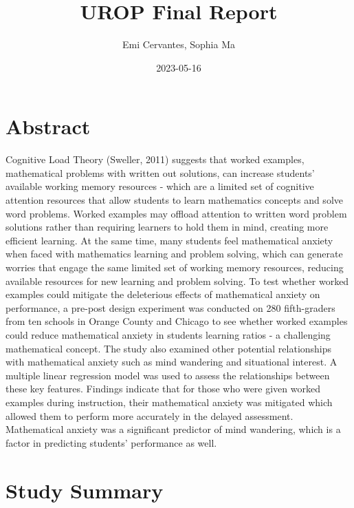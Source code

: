 \documentclass[
]{article}
\title{UROP Final Report}
\author{Emi Cervantes, Sophia Ma}
\date{2023-05-16}
\begin{document}
\maketitle

\hypertarget{abstract}{%
\section{Abstract}\label{abstract}}

Cognitive Load Theory (Sweller, 2011) suggests that worked examples,
mathematical problems with written out solutions, can increase students'
available working memory resources - which are a limited set of
cognitive attention resources that allow students to learn mathematics
concepts and solve word problems. Worked examples may offload attention
to written word problem solutions rather than requiring learners to hold
them in mind, creating more efficient learning. At the same time, many
students feel mathematical anxiety when faced with mathematics learning
and problem solving, which can generate worries that engage the same
limited set of working memory resources, reducing available resources
for new learning and problem solving. To test whether worked examples
could mitigate the deleterious effects of mathematical anxiety on
performance, a pre-post design experiment was conducted on 280
fifth-graders from ten schools in Orange County and Chicago to see
whether worked examples could reduce mathematical anxiety in students
learning ratios - a challenging mathematical concept. The study also
examined other potential relationships with mathematical anxiety such as
mind wandering and situational interest. A multiple linear regression
model was used to assess the relationships between these key features.
Findings indicate that for those who were given worked examples during
instruction, their mathematical anxiety was mitigated which allowed them
to perform more accurately in the delayed assessment. Mathematical
anxiety was a significant predictor of mind wandering, which is a factor
in predicting students' performance as well.

\hypertarget{study-summary}{%
\section{Study Summary}\label{study-summary}}
\end{document}
